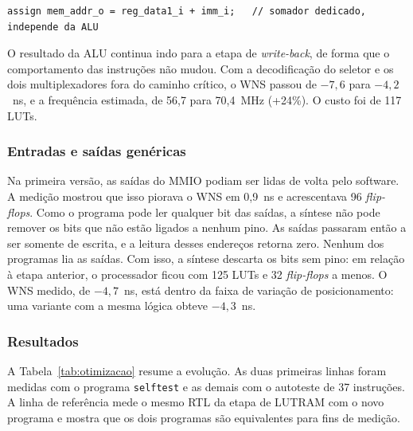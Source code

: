 \begin{lstlisting}
assign mem_addr_o = reg_data1_i + imm_i;   // somador dedicado, independe da ALU
\end{lstlisting}

O resultado da ALU continua indo para a etapa de \textit{write-back}, de
forma que o comportamento das instruções não mudou. Com a decodificação do
seletor e os dois multiplexadores fora do caminho crítico, o WNS passou de
$-7{,}6$ para $-4{,}2$~ns, e a frequência estimada, de 56,7 para 70,4~MHz
(+24\%). O custo foi de 117 LUTs.

\subsubsection{Entradas e saídas genéricas}

Na primeira versão, as saídas do MMIO podiam ser lidas de volta pelo software. A
medição mostrou que isso piorava o WNS em 0,9~ns e acrescentava 96
\textit{flip-flops}. Como o programa pode ler qualquer bit das saídas, a
síntese não pode remover os bits que não estão ligados a nenhum pino. As
saídas passaram então a ser somente de escrita, e a leitura desses
endereços retorna zero. Nenhum dos programas lia as saídas. Com isso, a
síntese descarta os bits sem pino: em relação à etapa anterior, o
processador ficou com 125 LUTs e 32 \textit{flip-flops} a menos. O WNS
medido, de $-4{,}7$~ns, está dentro da faixa de variação de posicionamento:
uma variante com a mesma lógica obteve $-4{,}3$~ns.

\subsubsection{Resultados}

A Tabela~\ref{tab:otimizacao} resume a evolução. As duas primeiras linhas
foram medidas com o programa \texttt{selftest} e as demais com o autoteste
de 37 instruções. A linha de referência mede o mesmo RTL da etapa de
LUTRAM com o novo programa e mostra que os dois programas são equivalentes
para fins de medição.

